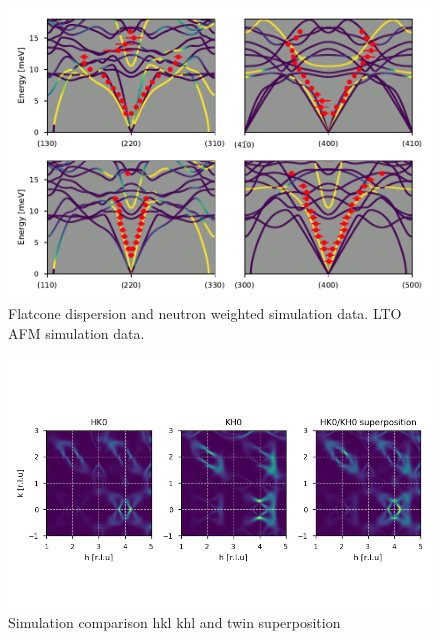 \begin{figure}[]
    \centering
    \includegraphics[width=\textwidth]{fig/lowen/flatcone_fits_simulation_afm.pdf}
    \caption[Flatcone dispersion and neutron weighted simulation data]{Flatcone dispersion and neutron weighted simulation data. LTO AFM simulation data.}
    \label{fig:flatcone_phonons_dispersion_simulation}
\end{figure}

\begin{figure}[]
    \centering
    \includegraphics[width=\textwidth]{fig/lowen/simulation_colorplot_twin_comparison.png}
    \caption[Simulation comparison hkl khl]{Simulation comparison hkl khl and twin superposition}
    \label{fig:lto_hk0_kh0_comparison}
\end{figure}

